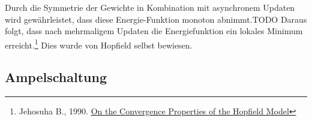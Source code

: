 Durch die Symmetrie der Gewichte in Kombination mit asynchronem Updaten wird gewährleistet, dass diese Energie-Funktion monoton abnimmt.TODO Daraus folgt, dass nach mehrmaligem Updaten die Energiefunktion ein lokales Minimum erreicht.\footnote{Jehosuha B., 1990. \href{ http://www.paradise.caltech.edu/CNS188/bruck90-conv.pdf}{On the Convergence Properties of the
Hopfield Model}} Dies wurde von Hopfield selbst bewiesen.

\subsection{Ampelschaltung}

